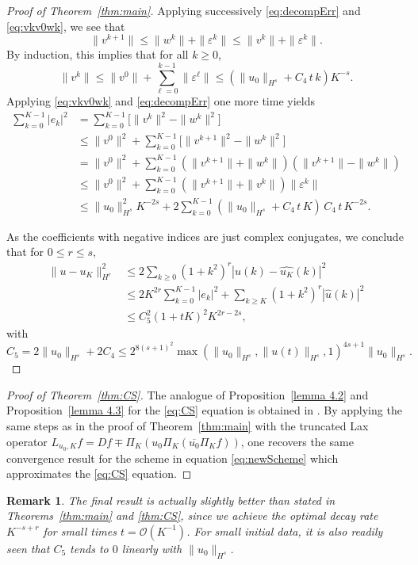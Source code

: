 \documentclass [11pt] {article}
\newtheorem{rem}[thm]{Remark}
\begin{document}
\begin{proof}[Proof of Theorem~\ref{thm:main}]
Applying successively \eqref{eq:decompErr} and \eqref{eq:vkv0wk}, we see that
\[
\|v^{k+1}\|\leq \|w^k\|+\|\varepsilon^{k}\| \leq \|v^k\|+\|\varepsilon^{k}\|.
\]
By induction, this implies that for all $k\ge 0$,
\[
\| v^k\|
\le\| v^0\| + \sum_{\ell =0}^{k-1} \|\varepsilon^\ell \| \le  (\|u_0\|_{H^s}+C_4\,t\,k)K^{-s}.
\]
Applying \eqref{eq:vkv0wk} and \eqref{eq:decompErr} one more time yields
\begin{align*}
\sum_{k=0}^{K-1} |e_k|^2 &= \sum_{k=0}^{K-1} \big[\|v^k\|^2-\|w^k\|^2\big]\\
&\leq \|v^0\|^2+\sum_{k=0}^{K-1} \big[\|v^{k+1}\|^2-\|w^{k}\|^2 \big]\\
&= \|v^0\|^2+\sum_{k=0}^{K-1} (\|v^{k+1}\|+\|w^{k}\|)(\|v^{k+1}\|-\|w^{k}\|)\\
& \leq \|v^0\|^2+\sum_{k=0}^{K-1} (\|v^{k+1}\|+\|v^{k}\|) \|\varepsilon^{k} \|\\
& \leq \|u_0\|_{H^s}^2K^{-2s}+2\sum_{k=0}^{K-1}  (\|u_0\|_{H^s}+C_4\,t\,K)\,C_4\,t\,K^{-2s}.
\end{align*}

As the coefficients with negative indices are just complex conjugates, we conclude that for $0\le r\le s$,
\begin{align*}
\|u-u_K\|_{H^r}^2
&\leq 2 \sum_{k \geq 0}(1+k^{2})^r|\widehat u(k)-\widehat{u_K}(k)|^2\\
& \leq 2K^{2r}\sum_{k=0}^{K-1}|e_k|^2 +\sum_{k\geq K}(1+k^{2})^r|\widehat u(k)|^2\\
& \leq C_5^2(1+tK)^2 K^{2r-2s},
\end{align*}
with 
\begin{equation}
\label{eq:cstFinal}
C_5=2\|u_0\|_{H^s}+ 2 C_4\leq 2^{8(s+1)^2}\max(\|u_0\|_{H^s},\|u(t)\|_{H^s},1)^{4s+1}\|u_0\|_{H^s}.
\end{equation}
\end{proof}

\begin{proof}[Proof of Theorem~\ref{thm:CS}]
The analogue of Proposition~\ref{lemma 4.2} and Proposition~\ref{lemma 4.3} for the \eqref{eq:CS} equation is obtained in \cite[Equation 2-11 and 2-14]{Bad24}.
By applying the same steps as in the proof of Theorem~\ref{thm:main} with the truncated Lax operator $L_{u_0,K}f=Df\mp \Pi_K(u_0\Pi_K(\overline{u_0}\Pi_K f))$, one  recovers the same convergence result for the scheme in equation \eqref{eq:newScheme} which approximates the \eqref{eq:CS} equation.
\end{proof}

\begin{rem}
The final result is actually slightly better than stated in Theorems~\ref{thm:main} and \ref{thm:CS}, since we achieve the optimal decay rate $K^{-s+r}$ for small times $t=\mathcal O(K^{-1})$. For small initial data, it is also readily seen that $C_5$ tends to $0$ linearly with $\|u_0\|_{H^s}$. 
\end{rem}
\end{document}
